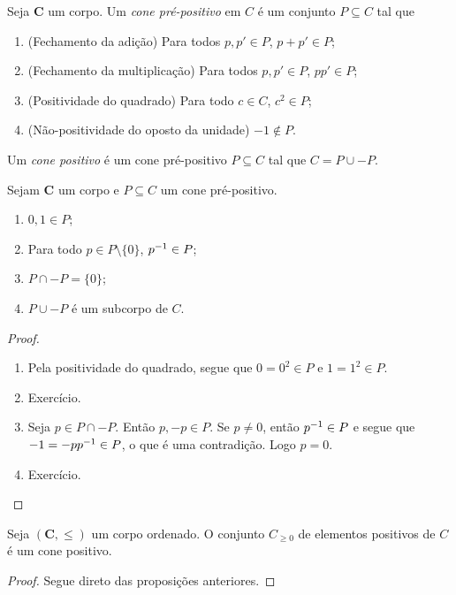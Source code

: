 \begin{definition}
Seja $\bm C$ um corpo. Um \emph{cone pré-positivo} em $C$ é um conjunto $P \subseteq C$ tal que
	\begin{enumerate}
	\item (Fechamento da adição) Para todos $p,p' \in P$, $p+p' \in P$;
	\item (Fechamento da multiplicação) Para todos $p,p' \in P$, $pp' \in P$;
	\item (Positividade do quadrado) Para todo $c \in C$, $c^2 \in P$;
	\item (Não-positividade do oposto da unidade) $-1 \notin P$.
	\end{enumerate}

Um \emph{cone positivo} é um cone pré-positivo $P \subseteq C$ tal que $C = P \cup -P$.
\end{definition}

\begin{proposition}
Sejam $\bm C$ um corpo e $P \subseteq C$ um cone pré-positivo.
	\begin{enumerate}
	\item $0,1 \in P$;
	\item Para todo $p \in P \setminus \{0\}$, $p ^{-1} \in P$;
	\item $P \cap -P = \{0\}$;
	\item $P \cup -P$ é um subcorpo de $C$.
	\end{enumerate}
\end{proposition}
\begin{proof}
	\begin{enumerate}
	\item Pela positividade do quadrado, segue que $0=0^2 \in P$ e $1=1^2 \in P$.
	
	\item Exercício.%
	
	\item Seja $p \in P \cap -P$. Então $p,-p \in P$. Se $p \neq 0$, então $p^{-1} \in P$ e segue que $-1 = -pp^{-1} \in P$, o que é uma contradição. Logo $p=0$.
	
	\item Exercício.
	
	\end{enumerate}
\end{proof}

\begin{proposition}
Seja $(\bm C,\leq)$ um corpo ordenado. O conjunto $C_{\geq  0}$ de elementos positivos de $C$ é um cone positivo.
\end{proposition}
\begin{proof}
Segue direto das proposições anteriores.
\end{proof}

